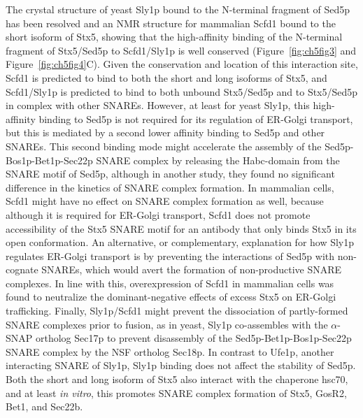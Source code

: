The crystal structure of yeast Sly1p bound to the N-terminal fragment of Sed5p has been resolved\cite{bracher_structural_2002} and an NMR structure for mammalian Scfd1 bound to the short isoform of Stx5\cite{arac_three-dimensional_2005}, showing that the high-affinity binding of the N-terminal fragment of Stx5/Sed5p to Scfd1/Sly1p is well conserved (Figure~\ref{fig:ch5fig3} and Figure~\ref{fig:ch5fig4}C). Given the conservation and location of this interaction site, Scfd1 is predicted to bind to both the short and long isoforms of Stx5, and Scfd1/Sly1p is predicted to bind to both unbound Stx5/Sed5p and to Stx5/Sed5p in complex with other SNAREs\cite{cottam_retrograde_2012,peng_sly1_2002}. However, at least for yeast Sly1p, this high-affinity binding to Sed5p is not required for its regulation of ER-Golgi transport, but this is mediated by a second lower affinity binding to Sed5p and other SNAREs\cite{peng_multiple_2004}. This second binding mode might accelerate the assembly of the Sed5p-Bos1p-Bet1p-Sec22p SNARE complex by releasing the Habc-domain from the SNARE motif of Sed5p\cite{demircioglu_sm_2014,kosodo_binding_2002}, although in another study, they found no significant difference in the kinetics of SNARE complex formation\cite{peng_sly1_2002}. In mammalian cells, Scfd1 might have no effect on SNARE complex formation as well, because although it is required for ER-Golgi transport, Scfd1 does not promote accessibility of the Stx5 SNARE motif for an antibody that only binds Stx5 in its open conformation\cite{williams_rsly1_2003}. An alternative, or complementary, explanation for how Sly1p regulates ER-Golgi transport is by preventing the interactions of Sed5p with non-cognate SNAREs, which would avert the formation of non-productive SNARE complexes\cite{peng_sly1_2002}. In line with this, overexpression of Scfd1 in mammalian cells was found to neutralize the dominant-negative effects of excess Stx5 on ER-Golgi trafficking\cite{dascher_mammalian_1996}. Finally, Sly1p/Scfd1 might prevent the dissociation of partly-formed SNARE complexes prior to fusion, as in yeast, Sly1p co-assembles with the $\alpha$-SNAP ortholog Sec17p to prevent disassembly of the Sed5p-Bet1p-Bos1p-Sec22p SNARE complex by the NSF ortholog Sec18p\cite{lobingier_sm_2014}. In contrast to Ufe1p, another interacting SNARE of Sly1p, Sly1p binding does not affect the stability of Sed5p\cite{braun_sm-protein-controlled_2007}. Both the short and long isoform of Stx5 also interact with the chaperone hsc70, and at least \emph{in vitro}, this promotes SNARE complex formation of Stx5, GosR2, Bet1, and Sec22b\cite{joglekar_evidence_2005}.

